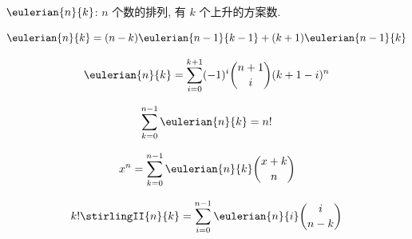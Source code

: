 \(\eulerian{n}{k}\): \(n\) 个数的排列, 有 \(k\) 个上升的方案数.

\[
    \eulerian{n}{k} = (n - k)\eulerian{n - 1}{k - 1} + (k + 1)\eulerian{n - 1}{k}
\]

\[
    \eulerian{n}{k} = \sum_{i = 0} ^ {k + 1} (-1)^i \binom{n + 1}{i} (k + 1 - i)^n
\]

\[
    \sum_{k = 0} ^ {n - 1} \eulerian{n}{k} = n!
\]

\[
    x^n = \sum_{k = 0} ^ {n - 1} \eulerian{n}{k} \binom{x+k}{n}
\]

\[
    k!\stirlingII{n}{k} = \sum_{i = 0} ^ {n - 1} \eulerian{n}{i} \binom{i}{n - k}
\]

